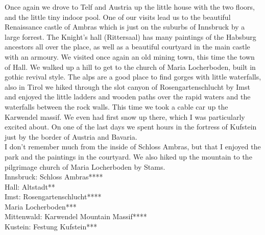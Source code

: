 Once again we drove to Telf and Austria up the little house with the two floors, and the little tiny indoor pool. One of our visits lead us to the beautiful Renaissance castle of Ambras which is just on the suburbs of Innsbruck by a large forrest. The Knight's hall (Rittersaal) has many paintings of the Habsburg ancestors all over the place, as well as a beautiful courtyard in the main castle with an armoury. We visited once again an old mining town, this time the town of Hall. We walked up a hill to get to the church of Maria Locherboden, built in gothic revival style. The alps are a good place to find gorges with little waterfalls, also in Tirol we hiked through the slot canyon of Rosengartenschlucht by Imst and enjoyed the little ladders and wooden paths over the rapid waters and the waterfalls between the rock walls. This time we took a cable car up the Karwendel massif. We even had first snow up there, which I was particularly excited about. On one of the last days we spent hours in the fortress of Kufstein just by the border of Austria and Bavaria.\\
I don't remember much from the inside of Schloss Ambras, but that I enjoyed the park and the paintings in the courtyard. We also hiked up the mountain to the pilgrimage church of Maria Locherboden by Stams.\\

Innsbruck: Schloss Ambras****\\
Hall: Altstadt**\\
Imst: Rosengartenschlucht****\\
Maria Locherboden***\\
Mittenwald: Karwendel Mountain Massif****\\
Kustein: Festung Kufstein***\\
